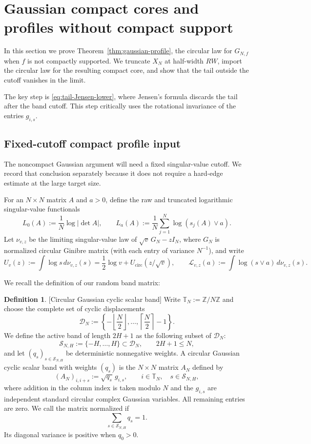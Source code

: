 \documentclass[11pt,reqno]{amsart}
\numberwithin{equation}{section}
\theoremstyle{definition}
\newtheorem{definition}[theorem]{Definition}
\theoremstyle{remark}
\newcommand{\1}{\mathbf 1}
\newcommand{\cir}{\mathrm{circ}}
\begin{document}
\section{Gaussian compact cores and profiles without compact support}
\label{sec:gaussian-general}

In this section we prove Theorem~\ref{thm:gaussian-profile}, the circular
law for \(G_{N,f}\) when \(f\) is not compactly supported.  We truncate
\(X_N\) at half-width \(RW\), import the circular law for the resulting
compact core, and show that the tail outside the cutoff vanishes in the
limit.

The key step is \eqref{eq:tail-Jensen-lower}, where Jensen's formula
discards the tail after the band cutoff.  This step critically uses the
rotational invariance of the entries \(g_{i,s}\).

\subsection{Fixed-cutoff compact profile input}
\label{sec:fixed-cutoff-core}

The noncompact Gaussian argument will need a fixed singular-value cutoff.
We record that conclusion separately because it does not require a hard-edge
estimate at the large target size.

For an \(N\times N\) matrix \(A\) and \(a>0\), define the raw and
truncated logarithmic singular-value functionals
\begin{equation}\label{eq:La-def}
 L_0(A):=\frac1N\log|\det A|,\qquad
 L_a(A):=\frac1N\sum_{j=1}^N\log(s_j(A)\vee a).
\end{equation}
Let $\nu_{v,z}$ be the limiting singular-value law of
$\sqrt v\,G_N-zI_N$, where $G_N$ is normalized circular Ginibre matrix
(with each entry of variance \(N^{-1}\)), and write
\begin{equation}\label{eq:Lv-def}
 U_v(z):=\int\log s\,d\nu_{v,z}(s)
 =\frac12\log v+U_{\cir}(z/\sqrt v),\qquad
 \mathcal L_{v,z}(a):=\int\log(s\vee a)\,d\nu_{v,z}(s).
\end{equation}

We recall the definition of our random band matrix:
\begin{definition}\label{CYCLIC5.1}[Circular Gaussian cyclic scalar band] Write $\mathbb T_N:=\mathbb Z/N\mathbb Z$ and choose the complete set of
cyclic displacements
\[
 \mathcal D_N:=
 \left\{-\left\lfloor\frac N2\right\rfloor,\ldots,
 \left\lceil\frac N2\right\rceil-1\right\}.
\]
We define the active band of length $2H+1$ as the following subset of $\mathcal D_N$:
\[
 \mathcal S_{N,H}:=\{-H,\ldots,H\}\subset\mathcal D_N,
 \qquad 2H+1\le N,
\]
and let $(q_s)_{s\in\mathcal S_{N,H}}$ be deterministic nonnegative
weights.  A circular Gaussian cyclic scalar band with weights
$(q_s)$ is the $N\times N$ matrix $A_N$ defined by
\[
 (A_N)_{i,i+s}:=\sqrt{q_s}\,g_{i,s},
 \qquad i\in\mathbb T_N,\quad s\in\mathcal S_{N,H},
\]
where addition in the column index is taken modulo $N$ and the
$g_{i,s}$ are independent standard circular complex Gaussian
variables.  All remaining entries are zero.  We call the matrix
normalized if
\[
 \sum_{s\in\mathcal S_{N,H}}q_s=1.
\]
Its diagonal variance is positive when $q_0>0$.
\end{definition}
\end{document}
